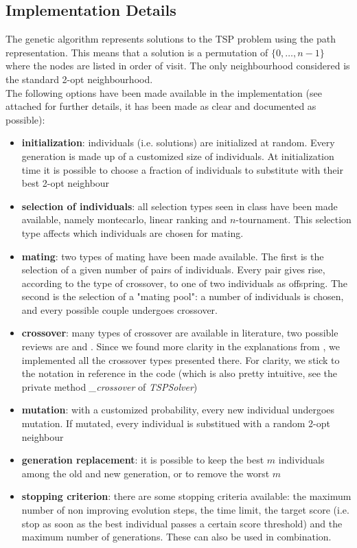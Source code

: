 \documentclass{article}
\begin{document}
\subsection*{Implementation Details}
The genetic algorithm represents solutions to the TSP problem using the path representation. This means that a solution is a permutation of $\{0, \ldots, n-1\}$ where the nodes are listed in order of visit. The only neighbourhood considered is the standard 2-opt neighbourhood. \\
The following options have been made available in the implementation (see attached for further details, it has been made as clear and documented as possible):
\begin{itemize}
\item \textbf{initialization}: individuals (i.e. solutions) are initialized at random. Every generation is made up of a customized size of individuals. At initialization time it is possible to choose a fraction of individuals to substitute with their best 2-opt neighbour

\item \textbf{selection of individuals}: all selection types seen in class have been made available, namely montecarlo, linear ranking and $n$-tournament. This selection type affects which individuals are chosen for mating.

\item \textbf{mating}: two types of mating have been made available. The first is the selection of a given number of pairs of individuals. Every pair gives rise, according to the type of crossover, to one of two individuals as offspring. The second is the selection of a "mating pool": a number of individuals is chosen, and every possible couple undergoes crossover.

\item \textbf{crossover}: many types of crossover are available in literature, two possible reviews are \cite{gupta2011study} and \cite{abdoun2012comparative}. Since we found more clarity in the explanations from \cite{gupta2011study}, we implemented all the crossover types presented there. For clarity, we stick to the notation in reference in the code (which is also pretty intuitive, see the private method \textit{\_crossover} of \textit{TSPSolver})

\item \textbf{mutation}: with a customized probability, every new individual undergoes mutation. If mutated, every individual is substitued with a random 2-opt neighbour

\item \textbf{generation replacement}: it is possible to keep the best $m$ individuals among the old and new generation, or to remove the worst $m$

\item \textbf{stopping criterion}: there are some stopping criteria available: the maximum number of non improving evolution steps, the time limit, the target score (i.e. stop as soon as the best individual passes a certain score threshold) and the maximum number of generations. These can also be used in combination.
\end{itemize}
\end{document}
